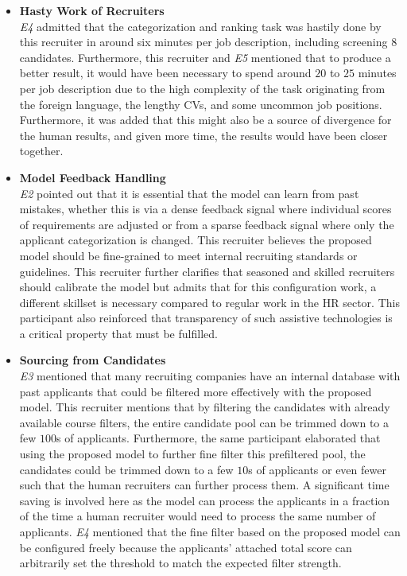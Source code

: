 \documentclass[draft,final]{thesisclass} %
\begin{document}
\begin{enumerate}
\begin{itemize}
        \item \textbf{Hasty Work of Recruiters}\\
        \textit{E4} admitted that the categorization and ranking task was hastily done by this recruiter in around six minutes per job description, including screening $8$ candidates. Furthermore, this recruiter and \textit{E5} mentioned that to produce a better result, it would have been necessary to spend around $20$ to $25$ minutes per job description due to the high complexity of the task originating from the foreign language, the lengthy \acs{CV}s, and some uncommon job positions. Furthermore, it was added that this might also be a source of divergence for the human results, and given more time, the results would have been closer together.
        \item \textbf{Model Feedback Handling}\\
        \textit{E2} pointed out that it is essential that the model can learn from past mistakes, whether this is via a dense feedback signal where individual scores of requirements are adjusted or from a sparse feedback signal where only the applicant categorization is changed. This recruiter believes the proposed model should be fine-grained to meet internal recruiting standards or guidelines. This recruiter further clarifies that seasoned and skilled recruiters should calibrate the model but admits that for this configuration work, a different skillset is necessary compared to regular work in the \acs{HR} sector. This participant also reinforced that transparency of such assistive technologies is a critical property that must be fulfilled.
        \item \textbf{Sourcing from Candidates}\\
        \textit{E3} mentioned that many recruiting companies have an internal database with past applicants that could be filtered more effectively with the proposed model. This recruiter mentions that by filtering the candidates with already available course filters, the entire candidate pool can be trimmed down to a few $100$s of applicants. Furthermore, the same participant elaborated that using the proposed model to further fine filter this prefiltered pool, the candidates could be trimmed down to a few $10$s of applicants or even fewer such that the human recruiters can further process them. A significant time saving is involved here as the model can process the applicants in a fraction of the time a human recruiter would need to process the same number of applicants. \textit{E4} mentioned that the fine filter based on the proposed model can be configured freely because the applicants' attached total score can arbitrarily set the threshold to match the expected filter strength.

\end{itemize}
\end{enumerate}
\end{document}
